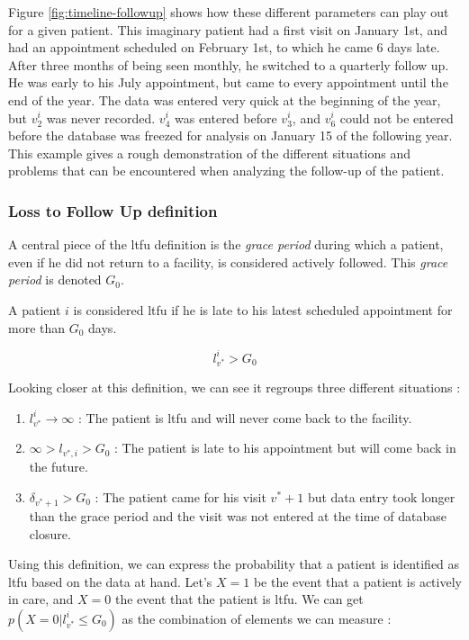 Figure \ref{fig:timeline-followup} shows how these different parameters can play out for a given patient. This imaginary patient had a first visit on January 1st, and had an appointment scheduled on February 1st, to which he came 6 days late. After three months of being seen monthly, he switched to a quarterly follow up. He was early to his July appointment, but came to every appointment until the end of the year. The data was entered very quick at the beginning of the year, but $v_2^i$ was never recorded. $v_4^i$ was entered before $v_3^i$, and $v_6^i$ could not be entered before the database was freezed for analysis on January 15 of the following year. This example gives a rough demonstration of the different situations and problems that can be encountered when analyzing the follow-up of the patient.

\subsubsection{Loss to Follow Up definition}

A central piece of the \gls{ltfu} definition is the  \textit{grace period} during which a patient, even if he did not return to a facility, is considered actively followed. This \textit{grace period} is denoted $G_0$.

A patient $i$ is considered \gls{ltfu} if he is late to his latest scheduled appointment for more than $G_0$ days.

$$l_{v^{*}}^i >  G_0$$

Looking closer at this definition, we can see it regroups three different situations :
\begin{enumerate}
\item $l_{v^{*}}^i \rightarrow \infty$ : The patient is \gls{ltfu} and will never come back to the facility.
\item $\infty > l_{v^{*},i} > G_0$ : The patient is late to his appointment but will come back in the future.
\item  $\delta_{v^*+1} > G_0$ : The patient came for his visit $v^{*} + 1$ but data entry took longer than the grace period and the visit was not entered at the time of database closure.
\end{enumerate}

Using this definition, we can express the probability that a patient is identified as \gls{ltfu} based on the data at hand. Let's $X = 1$ be the event that a patient is actively in care, and $X = 0$  the event that the patient is \gls{ltfu}. We can get $p(X = 0 | l_{v^{*}}^i \leq  G_0)$ as the combination of elements we can measure :


